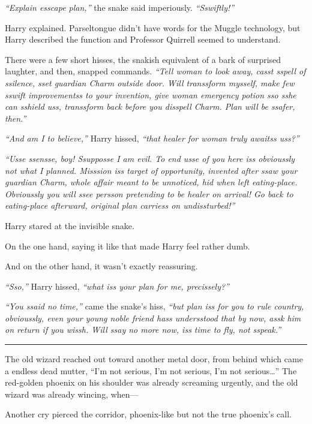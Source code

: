 \emph{``Explain esscape plan,''} the snake said imperiously.
\emph{``Sswiftly!''}

Harry explained. Parseltongue didn't have words for the Muggle
technology, but Harry described the function and Professor Quirrell
seemed to understand.

There were a few short hisses, the snakish equivalent of a bark of
surprised laughter, and then, snapped commands. \emph{``Tell woman to
look away, casst sspell of ssilence, sset guardian Charm outside door.
Will transsform mysself, make few sswift improvementss to your
invention, give woman emergency potion sso sshe can sshield uss,
transsform back before you disspell Charm. Plan will be ssafer, then.''}

\emph{``And am I to believe,''} Harry hissed, \emph{``that healer for
woman truly awaitss uss?''}

\emph{``Usse ssensse, boy! Ssupposse I am evil. To end usse of you here
iss obvioussly not what I planned. Misssion iss target of opportunity,
invented after ssaw your guardian Charm, whole affair meant to be
unnoticed, hid when left eating-place. Obvioussly you will ssee persson
pretending to be healer on arrival! Go back to eating-place afterward,
original plan carriess on undissturbed!''}

Harry stared at the invisible snake.

On the one hand, saying it like that made Harry feel rather dumb.

And on the other hand, it wasn't exactly reassuring.

\emph{``Sso,''} Harry hissed, \emph{``what iss your plan for me,
precissely?''}

\emph{``You ssaid no time,''} came the snake's hiss, \emph{``but plan
iss for you to rule country, obvioussly, even your young noble friend
hass undersstood that by now, assk him on return if you wissh. Will ssay
no more now, iss time to fly, not sspeak.''}

\begin{center}\rule{3in}{0.4pt}\end{center}

The old wizard reached out toward another metal door, from behind which
came a endless dead mutter, ``I'm not serious, I'm not serious, I'm not
serious\ldots{}'' The red-golden phoenix on his shoulder was already
screaming urgently, and the old wizard was already wincing, when---

Another cry pierced the corridor, phoenix-like but not the true
phoenix's call.

